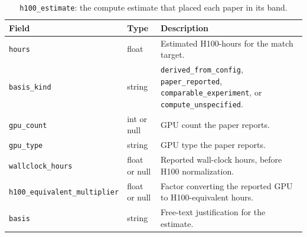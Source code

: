 \documentclass{article} %
\begin{document}
\begin{table}[t]
\caption{\texttt{h100\_estimate}: the compute estimate that placed each paper
in its band.}
\label{tab:schema-h100}
\begin{center}
\footnotesize
\begin{tabular}{@{}llp{6.8cm}@{}}
\toprule
Field & Type & Description \\
\midrule
\texttt{hours} & float & Estimated H100-hours for the match target. \\
\texttt{basis\_kind} & string & \texttt{derived\_from\_config}, \texttt{paper\_reported}, \texttt{comparable\_experiment}, or \texttt{compute\_unspecified}. \\
\texttt{gpu\_count} & int or null & GPU count the paper reports. \\
\texttt{gpu\_type} & string & GPU type the paper reports. \\
\texttt{wallclock\_hours} & float or null & Reported wall-clock hours, before H100 normalization. \\
\texttt{h100\_equivalent\_multiplier} & float or null & Factor converting the reported GPU to H100-equivalent hours. \\
\texttt{basis} & string & Free-text justification for the estimate. \\
\bottomrule
\end{tabular}
\end{center}
\end{table}
\end{document}
